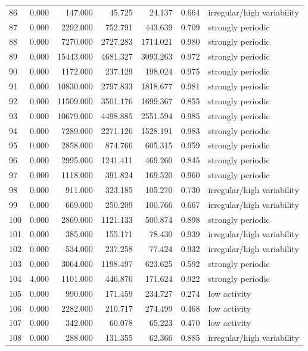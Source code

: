 \begin{longtable}{lrrrrrl}
86 & 0.000 & 147.000 & 45.725 & 24.137 & 0.664 & irregular/high variability \\
87 & 0.000 & 2292.000 & 752.791 & 443.639 & 0.709 & strongly periodic \\
88 & 0.000 & 7270.000 & 2727.283 & 1714.021 & 0.980 & strongly periodic \\
89 & 0.000 & 15443.000 & 4681.327 & 3093.263 & 0.972 & strongly periodic \\
90 & 0.000 & 1172.000 & 237.129 & 198.024 & 0.975 & strongly periodic \\
91 & 0.000 & 10830.000 & 2797.833 & 1818.677 & 0.981 & strongly periodic \\
92 & 0.000 & 11509.000 & 3501.176 & 1699.367 & 0.855 & strongly periodic \\
93 & 0.000 & 10679.000 & 4498.885 & 2551.594 & 0.985 & strongly periodic \\
94 & 0.000 & 7289.000 & 2271.126 & 1528.191 & 0.983 & strongly periodic \\
95 & 0.000 & 2858.000 & 874.766 & 605.315 & 0.959 & strongly periodic \\
96 & 0.000 & 2995.000 & 1241.411 & 469.260 & 0.845 & strongly periodic \\
97 & 0.000 & 1118.000 & 391.824 & 169.520 & 0.960 & strongly periodic \\
98 & 0.000 & 911.000 & 323.185 & 105.270 & 0.730 & irregular/high variability \\
99 & 0.000 & 669.000 & 250.209 & 100.766 & 0.667 & irregular/high variability \\
100 & 0.000 & 2869.000 & 1121.133 & 500.874 & 0.898 & strongly periodic \\
101 & 0.000 & 385.000 & 155.171 & 78.430 & 0.939 & irregular/high variability \\
102 & 0.000 & 534.000 & 237.258 & 77.424 & 0.932 & irregular/high variability \\
103 & 0.000 & 3064.000 & 1198.497 & 623.625 & 0.592 & strongly periodic \\
104 & 4.000 & 1101.000 & 446.876 & 171.624 & 0.922 & strongly periodic \\
105 & 0.000 & 990.000 & 171.459 & 234.727 & 0.274 & low activity \\
106 & 0.000 & 2282.000 & 210.717 & 274.499 & 0.468 & low activity \\
107 & 0.000 & 342.000 & 60.078 & 65.223 & 0.470 & low activity \\
108 & 0.000 & 288.000 & 131.355 & 62.366 & 0.885 & irregular/high variability \\

\end{longtable}
